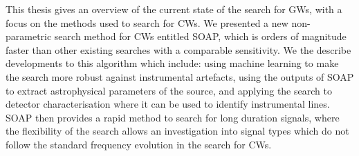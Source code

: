 This thesis gives an overview of the current state of the search for \glspl{GW}, with a focus on the methods used to search for \glspl{CW}.
We presented a new non-parametric search method for \glspl{CW} entitled SOAP, which is orders of magnitude faster than other existing searches with a comparable sensitivity.
We the describe developments to this algorithm which include: using machine learning to make the search more robust against instrumental artefacts, using the outputs of SOAP to extract astrophysical parameters of the source, and applying the search to detector characterisation where it can be used to identify instrumental lines.
SOAP then provides a rapid method to search for long duration signals, where the flexibility of the search allows an investigation into signal types which do not follow the standard frequency evolution in the search for \glspl{CW}.











